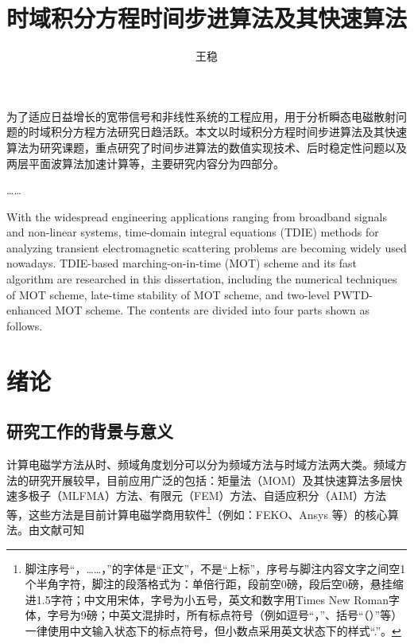 \documentclass[master]{thesis-uestc}
\title{时域积分方程时间步进算法及其快速算法}{The Time Marching Scheme of Time Domain
    Integral Equation and Corresponding Fast Algorithm}
\author{王稳}{Wang Wen}
\begin{document}
\makecover

\begin{chineseabstract}
为了适应日益增长的宽带信号和非线性系统的工程应用，用于分析瞬态电磁散射问题的时域积分方程方法研究日趋活跃。本文以时域积分方程时间步进算法及其快速算法为研究课题，重点研究了时间步进算法的数值实现技术、后时稳定性问题以及两层平面波算法加速计算等，主要研究内容分为四部分。

……

\end{chineseabstract}

\begin{englishabstract}
With the widespread engineering applications ranging from broadband signals and non-linear systems, time-domain integral equations (TDIE) methods for analyzing transient electromagnetic scattering problems are becoming widely used nowadays. TDIE-based marching-on-in-time (MOT) scheme and its fast algorithm are researched in this dissertation, including the numerical techniques of MOT scheme, late-time stability of MOT scheme, and two-level PWTD-enhanced MOT scheme. The contents are divided into four parts shown as follows.

\end{englishabstract}

\thesistableofcontents

\chapter{绪\hspace{6pt}论}

\section{研究工作的背景与意义}

计算电磁学方法从时、频域角度划分可以分为频域方法与时域方法两大类。频域方法的研究开展较早，目前应用广泛的包括：矩量法（MOM）及其快速算法多层快速多极子（MLFMA）方法、有限元（FEM）方法、自适应积分（AIM）方法等，这些方法是目前计算电磁学商用软件\footnote{脚注序号“，……，”的字体是“正文”，不是“上标”，序号与脚注内容文字之间空1个半角字符，脚注的段落格式为：单倍行距，段前空0磅，段后空0磅，悬挂缩进1.5字符；中文用宋体，字号为小五号，英文和数字用Times New Roman字体，字号为9磅；中英文混排时，所有标点符号（例如逗号“，”、括号“（）”等）一律使用中文输入状态下的标点符号，但小数点采用英文状态下的样式“.”。}（例如：FEKO、Ansys 等）的核心算法。由文献\cite{feng997he,clerc2010discrete,xiao2012yi}可知
\end{document}
